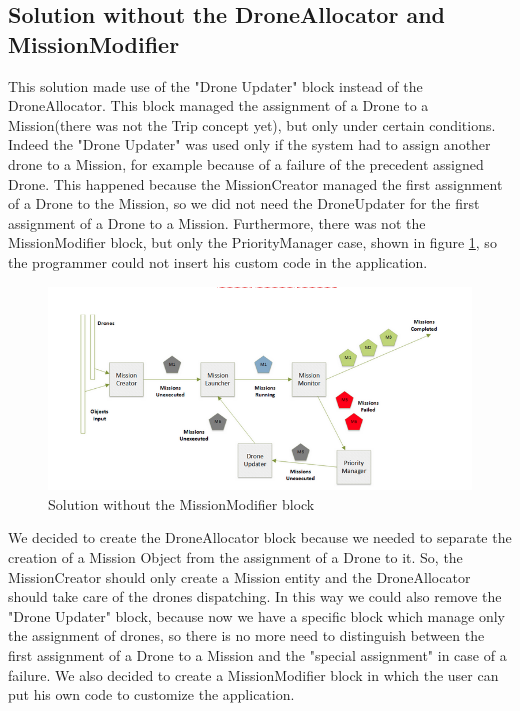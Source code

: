 \subsection{Solution without the DroneAllocator and MissionModifier}

This solution made use of the "Drone Updater" block instead of the DroneAllocator. 
This block managed the assignment of a Drone to a Mission(there was not the Trip concept yet), but only under certain conditions.
Indeed the "Drone Updater" was used only if the system had to assign another drone to a Mission, for example because of a failure of the precedent assigned Drone.
This happened because the MissionCreator managed the first assignment of a Drone to the Mission, so we did not need the DroneUpdater for the first assignment of a Drone to a Mission.
Furthermore, there was not the MissionModifier block, but only the PriorityManager case, shown in figure \ref{fig:noMM}, so the programmer could not insert his custom code in the application.


\begin{figure}[H]
  \centering
  \includegraphics[width=\linewidth]{pictures/NoMM.png}
  \caption{Solution without the MissionModifier block}
  \label{fig:noMM}
\end{figure}

We decided to create the DroneAllocator block because we needed to separate the creation of a Mission Object from the assignment of a Drone to it.
So, the MissionCreator should only create a Mission entity and the DroneAllocator should take care of the drones dispatching.
In this way we could also remove the "Drone Updater" block, because now we have a specific block which manage only the assignment of drones, so there is no more need to distinguish between the first assignment of a Drone to a Mission and the "special assignment" in case of a failure.
We also decided to create a MissionModifier block in which the user can put his own code to customize the application.